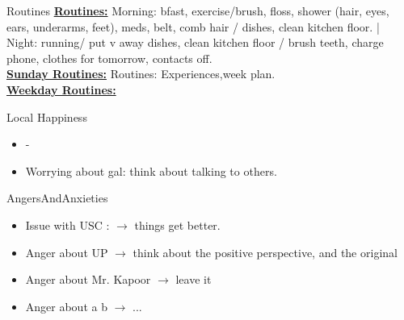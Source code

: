 \begin{columns}  %
  \begin{column}{0.20\linewidth}
    \begin{block}{Routines}
      { \tiny \underline{\bf Routines:} Morning: bfast, exercise/brush,
        floss, shower (hair, eyes, ears, underarms, feet), meds, belt,
        comb hair / dishes, clean kitchen floor. |  Night: running/ put
v        away dishes, clean kitchen floor / brush teeth, charge phone,
        clothes for tomorrow, contacts off.}\\
      {\tiny \underline{\bf Sunday Routines:} Routines:
        Experiences,week plan.}\\ 
      {\tiny \underline{\bf Weekday Routines:}}\\
    \end{block} 
    \begin{block}{Local Happiness}
      \begin{itemize} 
        \tiny \item \tiny -
      \item \tiny Worrying about gal: think about talking to others.
      \end{itemize} 
    \end{block}
    \begin{block}{AngersAndAnxieties}
      \begin{itemize}
        \item \tiny Issue with USC : $\rightarrow$ things get better. 
        \tiny \item \tiny Anger about UP $\rightarrow$ think about the positive
        perspective, and the original
      \item \tiny Anger about Mr. Kapoor $\rightarrow$  leave it
      \item \tiny Anger about a b  $\rightarrow$ ...

\end{itemize}
\end{block}
\end{column}
\end{columns}
